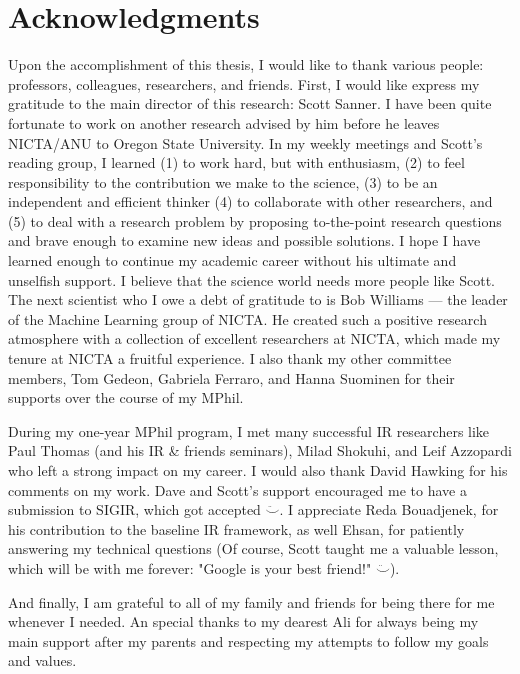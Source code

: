 \chapter*{Acknowledgments}

Upon the accomplishment of this thesis, I would like to thank various people: 
professors, colleagues, researchers, and friends. First, I would like express my gratitude to the main director of this research: Scott Sanner. I have been quite fortunate to work on another research advised by him before he leaves NICTA/ANU to Oregon State University. In my weekly meetings and Scott's reading group, I learned  (1) to work hard, but with enthusiasm, (2) to feel responsibility to the contribution we make to the science, (3) to be an independent and efficient thinker (4)  to collaborate with other researchers, and (5) to deal with a research problem by proposing to-the-point research questions and brave enough to examine new ideas and possible solutions. I hope I have learned enough to continue my academic career without his ultimate and unselfish support. I believe that the science world needs more people like Scott. The next scientist who I owe a debt of gratitude to is Bob Williams --- the leader of the Machine Learning group of NICTA. He created such a positive research atmosphere with a collection of excellent researchers at NICTA, which made my tenure at NICTA a fruitful experience.
I also thank my other committee members, Tom Gedeon, Gabriela Ferraro, and Hanna Suominen for their supports over the course of my MPhil.

During my one-year MPhil program, I met many successful IR researchers like Paul Thomas (and his IR \& friends seminars), Milad Shokuhi, and Leif Azzopardi who left a strong impact on my career. I would also thank David Hawking for his comments on my work. Dave and Scott's support encouraged me to have a submission to SIGIR, which got accepted $\ddot\smile$. 
I appreciate Reda Bouadjenek, for his contribution to the baseline IR framework, as well Ehsan, for patiently answering my technical questions (Of course, Scott taught me a valuable lesson, which will be with me forever: "Google is your best friend!" $\ddot\smile$).

And finally, I am grateful to all of my family and friends for being there for me whenever I needed. An special thanks to my dearest Ali for always being my main support after my parents and respecting my attempts to follow my goals and values. 
